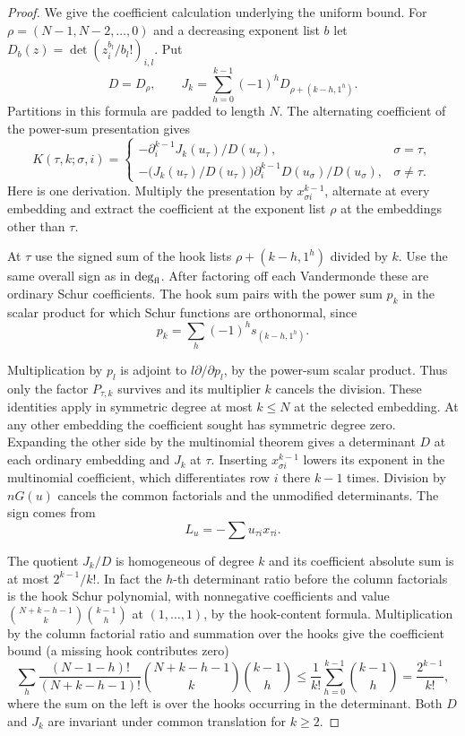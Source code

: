 \begin{proof}
We give the coefficient calculation underlying the uniform bound.
For \(\rho=(N-1,N-2,\ldots,0)\) and a decreasing exponent
list \(b\) let \(D_b(z)=\det(z_i^{b_l}/b_l!)_{i,l}\). Put
\[
   D=D_\rho,\qquad
   J_k=\sum_{h=0}^{k-1}(-1)^hD_{\rho+(k-h,1^h)} .
\]
Partitions in this formula are padded to length \(N\).
The alternating coefficient of the power-sum presentation gives
\[
 K(\tau,k;\sigma,i)=
 \begin{cases}
 -\partial_i^{k-1}J_k(u_\tau)/D(u_\tau),&\sigma=\tau,\\
 -\big(J_k(u_\tau)/D(u_\tau)\big)
    \partial_i^{k-1}D(u_\sigma)/D(u_\sigma),&\sigma\ne\tau .
 \end{cases}
\]
Here is one derivation. Multiply the presentation by
\(x_{\sigma i}^{k-1}\), alternate at every embedding and
extract the coefficient at the exponent list \(\rho\) at the
embeddings other than \(\tau\).

At \(\tau\) use the signed sum
of the hook lists \(\rho+(k-h,1^h)\) divided by \(k\).
Use the same overall sign as in \(\deg_{\rm fl}\).
After factoring off each Vandermonde these are ordinary Schur
coefficients. The hook sum pairs with the power sum \(p_k\)
in the scalar product for which Schur functions are orthonormal, since
\[
 p_k=\sum_h(-1)^h s_{(k-h,1^h)}.
\]

Multiplication by \(p_l\) is adjoint to \(l\partial/\partial p_l\),
by the power-sum scalar product. Thus only the factor
\(P_{\tau,k}\) survives and its multiplier \(k\) cancels the
division. These identities apply in symmetric degree at most
\(k\le N\) at the selected embedding. At any other embedding
the coefficient sought has symmetric degree zero.
Expanding the other side by the multinomial theorem gives a
determinant \(D\) at each ordinary embedding and \(J_k\) at
\(\tau\). Inserting \(x_{\sigma i}^{k-1}\) lowers its exponent
in the multinomial coefficient, which differentiates row \(i\)
there \(k-1\) times. Division by \(nG(u)\) cancels the common
factorials and the unmodified determinants. The sign comes from
\[
 L_u=-\sum u_{\tau i}x_{\tau i}.
\]
\cite{macdonald-symmetric}\label{cor:covolume-wall-shape-5}

The quotient \(J_k/D\) is homogeneous of degree \(k\)
and its coefficient absolute sum is at most \(2^{k-1}/k!\).
In fact the \(h\)-th determinant ratio before the column
factorials is the hook Schur polynomial, with nonnegative
coefficients and value \(\binom{N+k-h-1}{k}\binom{k-1}{h}\)
at \((1,\ldots,1)\), by the hook-content formula. Multiplication by the column factorial ratio and summation over the
hooks give the coefficient bound (a missing hook contributes zero)
\[
 \sum_h\frac{(N-1-h)!}{(N+k-h-1)!}
       \binom{N+k-h-1}{k}\binom{k-1}{h}
 \le\frac1{k!}\sum_{h=0}^{k-1}\binom{k-1}{h}=\frac{2^{k-1}}{k!},
\]
where the sum on the left is over the hooks occurring in the determinant.
Both \(D\) and \(J_k\) are invariant under common translation
for \(k\ge2\).


\end{proof}
